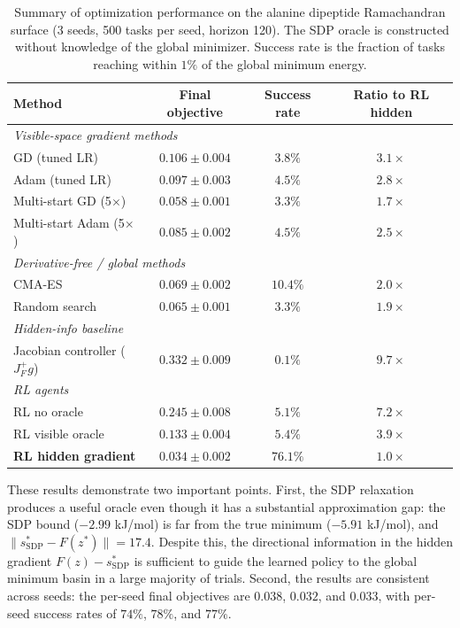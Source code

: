 \documentclass[10pt]{article}
\theoremstyle{definition}
\newcommand{\sdp}{\mathrm{SDP}}
\begin{document}
\begin{table}[t]
    \centering
    \caption{Summary of optimization performance on the alanine dipeptide Ramachandran surface (3 seeds, 500 tasks per seed, horizon 120). The SDP oracle is constructed without knowledge of the global minimizer. Success rate is the fraction of tasks reaching within $1\%$ of the global minimum energy.}
    \label{tab:alanine_results}
    \begin{tabular}{lccc}
        \toprule
        \textbf{Method} & \textbf{Final objective} & \textbf{Success rate} & \textbf{Ratio to RL hidden} \\
        \midrule
        \multicolumn{4}{l}{\emph{Visible-space gradient methods}} \\
        GD (tuned LR)          & $0.106 \pm 0.004$ & $3.8\%$  & $3.1\times$ \\
        Adam (tuned LR)        & $0.097 \pm 0.003$ & $4.5\%$  & $2.8\times$ \\
        Multi-start GD (5$\times$)  & $0.058 \pm 0.001$ & $3.3\%$ & $1.7\times$ \\
        Multi-start Adam (5$\times$) & $0.085 \pm 0.002$ & $4.5\%$ & $2.5\times$ \\
        \midrule
        \multicolumn{4}{l}{\emph{Derivative-free / global methods}} \\
        CMA-ES                 & $0.069 \pm 0.002$ & $10.4\%$ & $2.0\times$ \\
        Random search          & $0.065 \pm 0.001$ & $3.3\%$  & $1.9\times$ \\
        \midrule
        \multicolumn{4}{l}{\emph{Hidden-info baseline}} \\
        Jacobian controller ($J_F^+ g$) & $0.332 \pm 0.009$ & $0.1\%$ & $9.7\times$ \\
        \midrule
        \multicolumn{4}{l}{\emph{RL agents}} \\
        RL no oracle           & $0.245 \pm 0.008$ & $5.1\%$  & $7.2\times$ \\
        RL visible oracle      & $0.133 \pm 0.004$ & $5.4\%$  & $3.9\times$ \\
        \textbf{RL hidden gradient} & $\bm{0.034 \pm 0.002}$ & $\bm{76.1\%}$ & $1.0\times$ \\
        \bottomrule
    \end{tabular}
\end{table}

These results demonstrate two important points. First, the SDP relaxation produces a useful oracle even though it has a substantial approximation gap: the SDP bound ($-2.99$ kJ/mol) is far from the true minimum ($-5.91$ kJ/mol), and $\|s^*_{\sdp} - F(z^*)\| = 17.4$. Despite this, the directional information in the hidden gradient $F(z) - s^*_{\sdp}$ is sufficient to guide the learned policy to the global minimum basin in a large majority of trials. Second, the results are consistent across seeds: the per-seed final objectives are $0.038$, $0.032$, and $0.033$, with per-seed success rates of $74\%$, $78\%$, and $77\%$.
\end{document}
